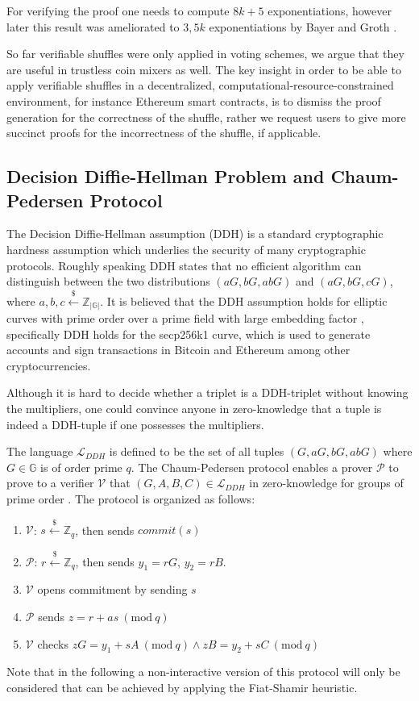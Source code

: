 \documentclass[a4paper]{article}
\theoremstyle{definition}
\newcommand{\Mod}[1]{\ (\mathrm{mod}\ #1)}
\begin{document}
For verifying the proof one needs to compute $8k+5$ exponentiations, however later this result was ameliorated to $3,5k$ exponentiations by Bayer and Groth \cite{bayer2012efficient}.

So far verifiable shuffles were only applied in voting schemes, we argue that they are useful in trustless coin mixers as well. The key insight in order to be able to apply verifiable shuffles in a decentralized, computational-resource-constrained environment, for instance Ethereum smart contracts, is to dismiss the proof generation for the correctness of the shuffle, rather we request users to give more succinct proofs for the incorrectness of the shuffle, if applicable.   

\subsection{Decision Diffie-Hellman Problem and Chaum-Pedersen Protocol}

The Decision Diffie-Hellman assumption (DDH) is a standard cryptographic hardness assumption which underlies the security of many cryptographic protocols. Roughly speaking DDH states that no efficient algorithm can distinguish between the two distributions $(aG, bG, abG)$ and $(aG, bG, cG)$, where $a,b,c\stackrel{\$}{\leftarrow}\mathbb{Z}_{|\mathbb{G}|}$. It is believed that the DDH assumption holds for elliptic curves with prime order over a prime field with large embedding factor \cite{boneh1998decision}, specifically DDH holds for the secp256k1 curve, which is used to generate accounts and sign transactions in Bitcoin and Ethereum among other cryptocurrencies. 

 Although it is hard to decide whether a triplet is a DDH-triplet without knowing the multipliers, one could convince anyone in zero-knowledge that a tuple is indeed a DDH-tuple if one possesses the multipliers.    

The language $\mathcal{L}_{DDH}$ is defined to be the set of all tuples $(G,aG,bG,abG)$ where $G\in \mathbb{G}$ is of order prime $q$. The Chaum-Pedersen protocol enables a prover $\mathcal{P}$ to prove to a verifier $\mathcal{V}$ that $(G,A,B,C)\in\mathcal{L}_{DDH}$ in zero-knowledge for groups of prime order \cite{chaum1992wallet}. The protocol is organized as follows:

\begin{enumerate}
	\item $\mathcal{V}$: $s\stackrel{\$}{\leftarrow}\mathbb{Z}_q$, then sends $commit(s)$ 
	\item $\mathcal{P}$: $r\stackrel{\$}{\leftarrow}\mathbb{Z}_q$, then sends $y_1=rG$, $y_2=rB$.
	\item $\mathcal{V}$ opens commitment by sending $s$
	\item $\mathcal{P}$ sends $z=r+as \Mod{q}$
	\item $\mathcal{V}$ checks $zG=y_{1}+sA \Mod{q} \land zB=y_{2}+sC \Mod{q}$
\end{enumerate} 
Note that in the following a non-interactive version of this protocol will only be considered that can be achieved by applying the Fiat-Shamir heuristic. 
\end{document}
